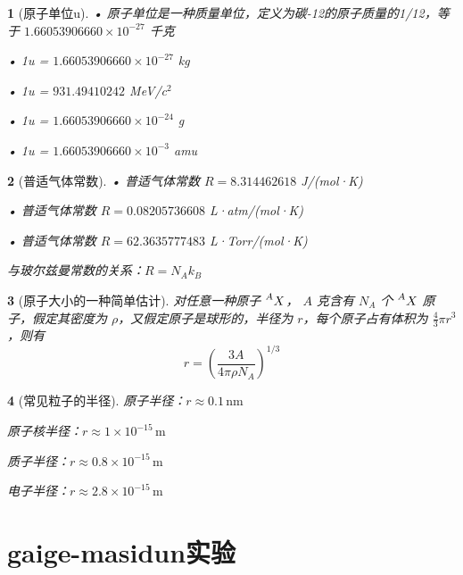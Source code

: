 \documentclass[UTF8]{report}
\theoremstyle{MyLineTheoremStyle} %
\theoremstyle{MyBlockTheoremStyle} %
\theoremstyle{MySubsubsectionStyle} %
\newtheorem{definition}{}
\begin{document}
\begin{definition}[原子单位u]
    • 原子单位是一种质量单位，定义为碳-12的原子质量的1/12，等于 \(1.66053906660 \times 10^{-27}\) 千克 \par
    • 1u = \(1.66053906660 \times 10^{-27}\) kg \par
    • 1u = \(931.49410242\) MeV/c\(^2\) \par
    • 1u = \(1.66053906660 \times 10^{-24}\) g \par
    • 1u = \(1.66053906660 \times 10^{-3}\) amu \par
\end{definition}

\begin{definition}[普适气体常数]
    • 普适气体常数 \(R = 8.314462618\) J/(mol·K) \par
    • 普适气体常数 \(R = 0.08205736608\) L·atm/(mol·K) \par
    • 普适气体常数 \(R = 62.3635777483\) L·Torr/(mol·K) \par
    与玻尔兹曼常数的关系：\(R = N_A k_B\) \par
    \end{definition}

    \begin{definition}[原子大小的一种简单估计]
        对任意一种原子 \( \prescript{A}{}{X}\)， \( A \) 克含有 \( N_A \) 个 \( \prescript{A}{}{X}\) 原子，假定其密度为 \( \rho \)，又假定原子是球形的，半径为 \( r \)，每个原子占有体积为 \( \frac{4}{3}\pi r^3 \)，则有
        \[
        r=\left(\frac{3A}{4 \pi \rho N_{A}}\right)^{1 / 3}
        \]
    \end{definition}

\begin{definition}[常见粒子的半径]
    原子半径：\(r \approx 0.1 \, \text{nm}\) \par
    原子核半径：\(r \approx 1 \times 10^{-15} \, \text{m}\) \par
    质子半径：\(r \approx 0.8 \times 10^{-15} \, \text{m}\) \par
    电子半径：\(r \approx 2.8 \times 10^{-15} \, \text{m}\) \par
\end{definition}

\section{gaige-masidun实验}
\end{document}
